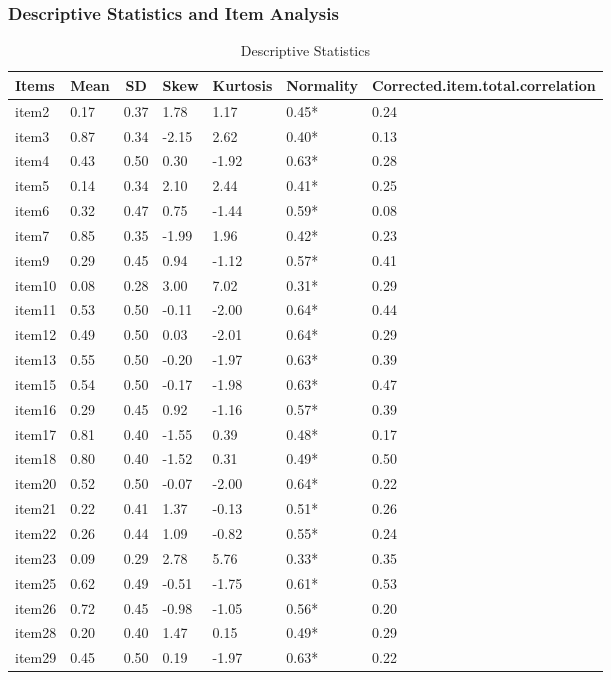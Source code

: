 \documentclass[
  english,
  man]{apa6}
\begin{document}
\hypertarget{descriptive-statistics-and-item-analysis}{%
\subsubsection{Descriptive Statistics and Item Analysis}\label{descriptive-statistics-and-item-analysis}}

\begin{table}[tbp]

\begin{center}
\begin{threeparttable}

\caption{\label{tab:tabDes}Descriptive Statistics}

\begin{tabular}{lllllll}
\toprule
Items & \multicolumn{1}{c}{Mean} & \multicolumn{1}{c}{SD} & \multicolumn{1}{c}{Skew} & \multicolumn{1}{c}{Kurtosis} & \multicolumn{1}{c}{Normality} & \multicolumn{1}{c}{Corrected.item.total.correlation}\\
\midrule
item2 & 0.17 & 0.37 & 1.78 & 1.17 & 0.45* & 0.24\\
item3 & 0.87 & 0.34 & -2.15 & 2.62 & 0.40* & 0.13\\
item4 & 0.43 & 0.50 & 0.30 & -1.92 & 0.63* & 0.28\\
item5 & 0.14 & 0.34 & 2.10 & 2.44 & 0.41* & 0.25\\
item6 & 0.32 & 0.47 & 0.75 & -1.44 & 0.59* & 0.08\\
item7 & 0.85 & 0.35 & -1.99 & 1.96 & 0.42* & 0.23\\
item9 & 0.29 & 0.45 & 0.94 & -1.12 & 0.57* & 0.41\\
item10 & 0.08 & 0.28 & 3.00 & 7.02 & 0.31* & 0.29\\
item11 & 0.53 & 0.50 & -0.11 & -2.00 & 0.64* & 0.44\\
item12 & 0.49 & 0.50 & 0.03 & -2.01 & 0.64* & 0.29\\
item13 & 0.55 & 0.50 & -0.20 & -1.97 & 0.63* & 0.39\\
item15 & 0.54 & 0.50 & -0.17 & -1.98 & 0.63* & 0.47\\
item16 & 0.29 & 0.45 & 0.92 & -1.16 & 0.57* & 0.39\\
item17 & 0.81 & 0.40 & -1.55 & 0.39 & 0.48* & 0.17\\
item18 & 0.80 & 0.40 & -1.52 & 0.31 & 0.49* & 0.50\\
item20 & 0.52 & 0.50 & -0.07 & -2.00 & 0.64* & 0.22\\
item21 & 0.22 & 0.41 & 1.37 & -0.13 & 0.51* & 0.26\\
item22 & 0.26 & 0.44 & 1.09 & -0.82 & 0.55* & 0.24\\
item23 & 0.09 & 0.29 & 2.78 & 5.76 & 0.33* & 0.35\\
item25 & 0.62 & 0.49 & -0.51 & -1.75 & 0.61* & 0.53\\
item26 & 0.72 & 0.45 & -0.98 & -1.05 & 0.56* & 0.20\\
item28 & 0.20 & 0.40 & 1.47 & 0.15 & 0.49* & 0.29\\
item29 & 0.45 & 0.50 & 0.19 & -1.97 & 0.63* & 0.22\\
\bottomrule
\end{tabular}


\end{threeparttable}
\end{center}
\end{table}
\end{document}
